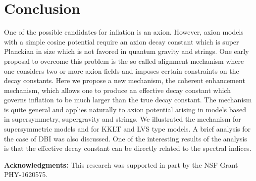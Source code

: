 \documentclass[12pt]{article}
\begin{document}
\section{Conclusion \label{sec:Conclusion}}
One of the possible candidates for inflation is an axion.
However, axion models with a simple cosine potential require an axion decay constant which is super Planckian in size which is not favored in quantum gravity and strings.
One early proposal to overcome this problem is the so called alignment mechanism where one considers two or more axion fields and imposes certain constraints on the decay constants.
Here we propose a new mechanism, the coherent enhancement mechanism, which allows one to produce an effective decay constant which governs inflation to be much larger than the true decay constant.
The mechanism is quite general and applies naturally to axion potential arising in models based in supersymmetry, supergravity and strings.
We illustrated the mechanism for supersymmetric models and for KKLT and LVS type models.
A brief analysis for the case of DBI was also discussed.
One of the interesting results of the analysis is that the effective decay constant can be directly related to the spectral indices.

\textbf{Acknowledgments:}
This research was supported in part by the NSF Grant PHY-1620575.

\clearpage
\end{document}
